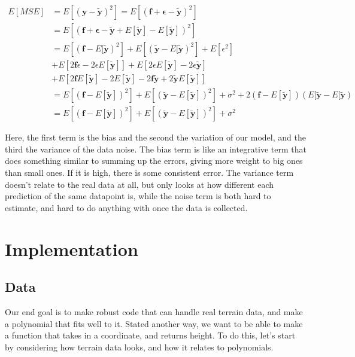 \documentclass[11pt, a4paper]{report}
\begin{document}
\begin{align}
E[MSE] &= E\left[(\pmb{y} - \pmb{\tilde{y}})^2 \right] = E\left[(\pmb{f} + \pmb{\epsilon} - \pmb{\tilde{y}})^2 \right] \\
&= E\left[(\pmb{f} + \pmb{\epsilon} - \pmb{\tilde{y}} + E[\pmb{\tilde{y}}] - E[\pmb{\tilde{y}}] )^2 \right] \\
&= E\left[\left(\pmb{f} - E[\pmb{\tilde{y}}\right)^2 \right] + E\left[\left(\pmb{\tilde{y}} - E[\pmb{\tilde{y}}\right)^2 \right] + E\left[\epsilon^2\right] \\
&+ E\left[2\pmb{f}\epsilon - 2\epsilon E[\pmb{\tilde{y}}]\right] + E\left[ 2\epsilon E[\pmb{\tilde{y}}] - 2\epsilon\pmb{\tilde{y}} \right] \\
&+ E\left[ 2\pmb{f} E[\pmb{\tilde{y}}] - 2E[\pmb{\tilde{y}}] - 2 \pmb{f} \pmb{\tilde{y}} + 2\pmb{\tilde{y}} E[\pmb{\tilde{y}}] \right] \\
&= E\left[ \left( \pmb{f} - E[\pmb{\tilde{y}}] \right)^2 \right] + E\left[ \left( \pmb{\tilde{y}} - E[\pmb{\tilde{y}}] \right)^2 \right] + \sigma^2 + 2\left( \pmb{f} - E[\pmb{\tilde{y}}] \right) \left( E[\pmb{\tilde{y}} - E[\pmb{\tilde{y}}\right) \\
&= E\left[ \left( \pmb{f} - E[\pmb{\tilde{y}}] \right)^2 \right] + E\left[ \left( \pmb{\tilde{y}} - E[\pmb{\tilde{y}}] \right)^2 \right] + \sigma^2
\end{align}

Here, the first term is the bias and the second the variation of our model, and the third the variance of the data noise. The bias term is like an integrative term that does something similar to summing up the errors, giving more weight to big ones than small ones. If it is high, there is some consistent error. The variance term doesn't relate to the real data at all, but only looks at how different each prediction of the same datapoint is, while the noise term is both hard to estimate, and hard to do anything with once the data is collected.

\chapter{Implementation}

\section{Data}
Our end goal is to make robust code that can handle real terrain data, and make a polynomial that fits well to it. Stated another way, we want to be able to make a function that takes in a coordinate, and returns height. To do this, let's start by considering how terrain data looks, and how it relates to polynomials.
\end{document}
